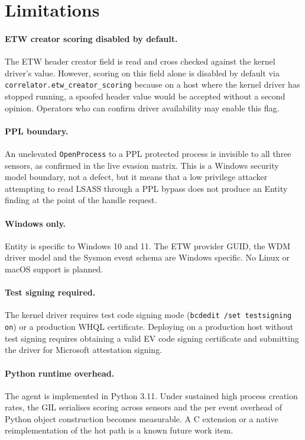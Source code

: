 \documentclass[10pt,twocolumn,letterpaper]{article}
\newcommand{\code}[1]{\texttt{\small #1}}
\begin{document}
\section{Limitations}
\label{sec:limits}

\paragraph{ETW creator scoring disabled by default.}
The ETW header creator field is read and cross checked against the kernel driver's value.
However, scoring on this field alone is disabled by default via
\code{correlator.etw\_creator\_scoring} because on a host where the kernel driver has
stopped running, a spoofed header value would be accepted without a second opinion.
Operators who can confirm driver availability may enable this flag.

\paragraph{PPL boundary.}
An unelevated \code{OpenProcess} to a PPL protected process is invisible to all three
sensors, as confirmed in the live evasion matrix. This is a Windows security model
boundary, not a defect, but it means that a low privilege attacker attempting to read
LSASS through a PPL bypass does not produce an Entity finding at the point of the handle
request.

\paragraph{Windows only.}
Entity is specific to Windows 10 and 11. The ETW provider GUID, the WDM driver model
and the Sysmon event schema are Windows specific. No Linux or macOS support is planned.

\paragraph{Test signing required.}
The kernel driver requires test code signing mode (\code{bcdedit /set testsigning on})
or a production WHQL certificate. Deploying on a production host without test signing
requires obtaining a valid EV code signing certificate and submitting the driver for
Microsoft attestation signing.

\paragraph{Python runtime overhead.}
The agent is implemented in Python 3.11. Under sustained high process creation rates,
the GIL serialises scoring across sensors and the per event overhead of Python object
construction becomes measurable. A C extension or a native reimplementation of the hot
path is a known future work item.
\end{document}
